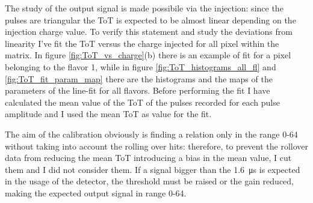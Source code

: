         The study of the output signal is made possibile via the injection: since the pulses are triangular the ToT is expected to be almost linear depending on the injection charge value.
        To verify this statement and study the deviations from linearity I've fit the ToT versus the charge injected for all pixel within the matrix.
        In figure \ref{fig:ToT_vs_charge}(b) there is an example of fit for a pixel belonging to the flavor 1, while in figure \ref{fig:ToT_histograms_all_fl} and \ref{fig:ToT_fit_param_map} there are the histograms and the maps of the parameters of the line-fit for all flavors.  
        Before performing the fit I have calculated the mean value of the ToT of the pulses recorded for each pulse amplitude and I used the mean ToT as value for the fit. 
        
        The aim of the calibration obviously is finding a relation only in the range 0-64 without taking into account the rolling over hits: therefore, to prevent the rollover data from reducing the mean ToT introducing a bias in the mean value, I cut them and I did not consider them. 
        If a signal bigger than the \SI{1.6}{\us} is expected in the usage of the detector, the threshold must be raised or the gain reduced, making the expected output signal in range 0-64.  

